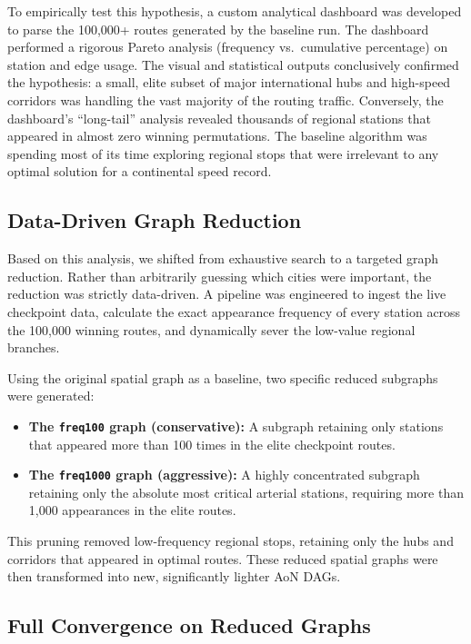 \medskip

To empirically test this hypothesis, a custom analytical dashboard was developed to parse the 100,000+ routes generated by the baseline run. The dashboard performed a rigorous Pareto analysis (frequency vs.\ cumulative percentage) on station and edge usage. The visual and statistical outputs conclusively confirmed the hypothesis: a small, elite subset of major international hubs and high-speed corridors was handling the vast majority of the routing traffic. Conversely, the dashboard's ``long-tail'' analysis revealed thousands of regional stations that appeared in almost zero winning permutations. The baseline algorithm was spending most of its time exploring regional stops that were irrelevant to any optimal solution for a continental speed record.

\subsection{Data-Driven Graph Reduction}
\label{subsec:data_driven_graph_reduction}

Based on this analysis, we shifted from exhaustive search to a targeted graph reduction. Rather than arbitrarily guessing which cities were important, the reduction was strictly data-driven. A pipeline was engineered to ingest the live checkpoint data, calculate the exact appearance frequency of every station across the 100,000 winning routes, and dynamically sever the low-value regional branches.

Using the original spatial graph as a baseline, two specific reduced subgraphs were generated:
\begin{itemize}
    \item \textbf{The \texttt{freq100} graph (conservative):} A subgraph retaining only stations that appeared more than 100 times in the elite checkpoint routes.
    \item \textbf{The \texttt{freq1000} graph (aggressive):} A highly concentrated subgraph retaining only the absolute most critical arterial stations, requiring more than 1,000 appearances in the elite routes.
\end{itemize}

This pruning removed low-frequency regional stops, retaining only the hubs and corridors that appeared in optimal routes. These reduced spatial graphs were then transformed into new, significantly lighter AoN DAGs.

\subsection{Full Convergence on Reduced Graphs}
\label{subsec:full_convergence_reduced}

